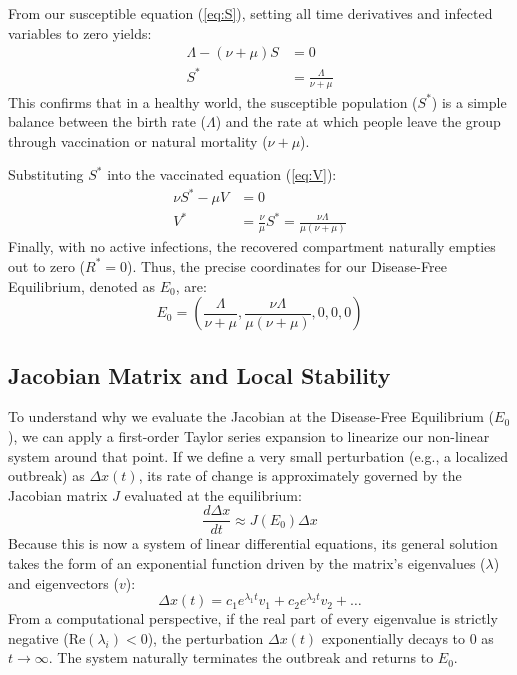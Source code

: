 \documentclass[12pt]{article}
\begin{document}
From our susceptible equation (\ref{eq:S}), setting all time derivatives and infected variables to zero yields:
\begin{align*}
\Lambda - (\nu + \mu)S &= 0 \\
S^* &= \frac{\Lambda}{\nu + \mu}
\end{align*}
This confirms that in a healthy world, the susceptible population ($S^*$) is a simple balance between the birth rate ($\Lambda$) and the rate at which people leave the group through vaccination or natural mortality ($\nu + \mu$).

Substituting $S^*$ into the vaccinated equation (\ref{eq:V}):
\begin{align*}
\nu S^* - \mu V &= 0 \\
V^* &= \frac{\nu}{\mu} S^* = \frac{\nu \Lambda}{\mu(\nu + \mu)}
\end{align*}
Finally, with no active infections, the recovered compartment naturally empties out to zero ($R^* = 0$). Thus, the precise coordinates for our Disease-Free Equilibrium, denoted as $E_0$, are:
\begin{equation}
E_0 = \left( \frac{\Lambda}{\nu + \mu}, \frac{\nu \Lambda}{\mu(\nu + \mu)}, 0, 0, 0 \right)
\end{equation}

\subsection{Jacobian Matrix and Local Stability}
To understand why we evaluate the Jacobian at the Disease-Free Equilibrium ($E_0$), we can apply a first-order Taylor series expansion to linearize our non-linear system around that point. If we define a very small perturbation (e.g., a localized outbreak) as $\Delta x(t)$, its rate of change is approximately governed by the Jacobian matrix $J$ evaluated at the equilibrium:
\begin{equation}
\frac{d\Delta x}{dt} \approx J(E_0) \Delta x
\end{equation}
Because this is now a system of linear differential equations, its general solution takes the form of an exponential function driven by the matrix's eigenvalues ($\lambda$) and eigenvectors ($v$):
\begin{equation}
\Delta x(t) = c_1 e^{\lambda_1 t} v_1 + c_2 e^{\lambda_2 t} v_2 + \dots
\end{equation}
From a computational perspective, if the real part of every eigenvalue is strictly negative ($\text{Re}(\lambda_i) < 0$), the perturbation $\Delta x(t)$ exponentially decays to $0$ as $t \to \infty$. The system naturally terminates the outbreak and returns to $E_0$.
\end{document}
